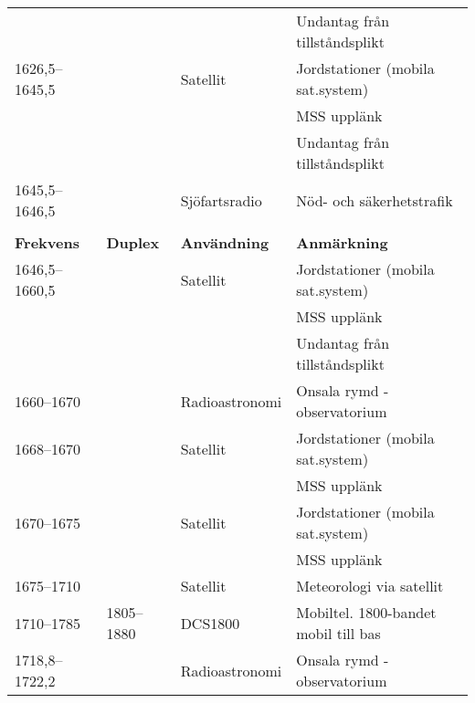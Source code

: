 \documentclass[10pt,swedish,a4paper,twoside]{article}
\begin{document}
\begin{landscape}
\begin{longtable}{llll}
	                   &                    &                         & Undantag från tillståndsplikt            \\
	1626,5--1645,5     &                    & Satellit                & Jordstationer (mobila sat.system)        \\
	                   &                    &                         & MSS upplänk                              \\
	                   &                    &                         & Undantag från tillståndsplikt            \\
	1645,5--1646,5     &                    & Sjöfartsradio           & Nöd- och säkerhetstrafik                 \\
	                   &                    &                         &  \\
	\textbf{Frekvens}  & \textbf{Duplex}    & \textbf{Användning}     & \textbf{Anmärkning}                      \\ \hline
	1646,5--1660,5     &                    & Satellit                & Jordstationer (mobila sat.system)        \\
	                   &                    &                         & MSS upplänk                              \\
	                   &                    &                         & Undantag från tillståndsplikt            \\
	1660--1670         &                    & Radioastronomi          & Onsala rymd - observatorium              \\
	1668--1670         &                    & Satellit                & Jordstationer (mobila sat.system)        \\
	                   &                    &                         & MSS upplänk                              \\
	1670--1675         &                    & Satellit                & Jordstationer (mobila sat.system)        \\
	                   &                    &                         & MSS upplänk                              \\
	1675--1710         &                    & Satellit                & Meteorologi via satellit                 \\
	1710--1785         & 1805--1880         & DCS1800                 & Mobiltel. 1800-bandet mobil till bas     \\
	1718,8--1722,2     &                    & Radioastronomi          & Onsala rymd - observatorium              \\

\end{longtable}
\end{landscape}
\end{document}
